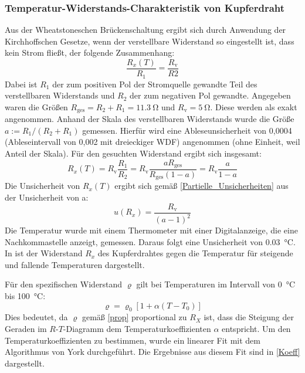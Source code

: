 \documentclass[
	a4paper,
	12pt,
	pagesize,
	ngerman
]{scrartcl}
\begin{document}
	\subsubsection{Temperatur-Widerstands-Charakteristik von Kupferdraht}
	Aus der Wheatstoneschen Brückenschaltung ergibt sich durch Anwendung der Kirchhoffschen Gesetze, wenn der verstellbare Widerstand so eingestellt ist, dass kein Strom fließt, der folgende Zusammenhang:
	\begin{equation}
		\frac{R_x(T)}{R_1}=\frac{R_\text{v}}{R2}
	\end{equation}
	Dabei ist $R_1$ der zum positiven Pol der Stromquelle gewandte Teil des verstellbaren Widerstands und $R_2$ der zum negativen Pol gewandte.
	Angegeben waren die Größen $R_\text{ges}=R_2+R_1=\SI{11,3}{\ohm}$ und $R_\text{v}=\SI{5}{\ohm}$.
	Diese werden als exakt angenommen.
	Anhand der Skala des verstellbaren Widerstands wurde die Größe $a:=R_1/(R_2+R_1)$ gemessen.
	Hierfür wird eine Ableseunsicherheit von 0,0004 (Ableseintervall von 0,002 mit dreieckiger WDF) angenommen (ohne Einheit, weil Anteil der Skala).
	Für den gesuchten Widerstand ergibt sich insgesamt:
	\begin{equation}
		R_x(T)=R_\text{v} \frac{R_1}{R_2}=R_\text{v} \frac{aR_\text{ges}}{R_\text{ges}(1-a)}=R_\text{v} \frac{a}{1-a}
	\end{equation}
	Die Unsicherheit von $R_x(T)$ ergibt sich gemäß \cref{Partielle_Unsicherheiten} aus der Unsicherheit von a:
	\begin{equation}
		u(R_x)= \frac{R_\text{v}}{(a-1)^2}
	\end{equation}
	Die Temperatur wurde mit einem Thermometer mit einer Digitalanzeige, die eine Nachkommastelle anzeigt, gemessen.
	Daraus folgt eine Unsicherheit von \SI{0,03}{\celsius}.
	In  ist der Widerstand $R_x$ des Kupferdrahtes gegen die Temperatur für steigende und fallende Temperaturen dargestellt.
	\par 
	Für den spezifischen Widerstand $\varrho $ gilt bei Temperaturen im Intervall von \SI{0}{\celsius} bis \SI{100}{\celsius}:
	\begin{equation}
		\varrho =\varrho_0 \left[ 1+\alpha (T-T_0) \right]
	\end{equation}
	Dies bedeutet, da $\varrho$ gemäß \cref{prop} proportional zu $R_X$ ist, dass die Steigung der Geraden im $R$-$T$-Diagramm dem Temperaturkoeffizienten $\alpha$ entspricht.
	Um den Temperaturkoeffizienten zu bestimmen, wurde ein linearer Fit mit dem Algorithmus von York durchgeführt.
	Die Ergebnisse aus diesem Fit sind in \cref{Koeff} dargestellt.
\end{document}
